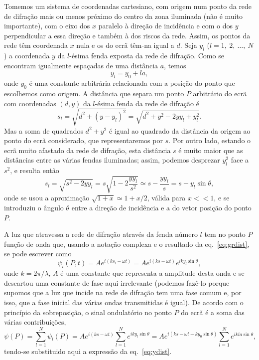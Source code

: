 Tomemos um sistema de coordenadas cartesiano, com origem num ponto da rede de
difração mais ou menos próximo do centro da zona iluminada (não é muito
importante), com o eixo dos $x$ paralelo à direção de incidência e com o dos $y$
perpendicular a essa direção e também à dos riscos da rede. Assim, os pontos da
rede têm coordenada $x$ nula e os do ecrã têm-na igual a $d$. Seja $y_l$ ($l=1,\
2,\ \ldots,\ N$) a coordenada $y$ da $l$-ésima fenda exposta da rede de
difração.  Como se encontram igualmente espaçadas de uma distância $a$, temos
\begin{equation}\label{eq:ydist}
  y_l = y_0+la,
\end{equation}
onde $y_0$ é uma constante arbitrária relacionada com a posição do ponto que
escolhemos como origem. A distância que separa um ponto $P$ arbitrário do ecrã
com coordenadas $(d,y)$ da $l$-ésima fenda da rede de difração é
\begin{equation*}
  s_l=\sqrt{d^2+(y-y_l)^2}=\sqrt{d^2 + y^2 - 2yy_l+y_l^2}.
\end{equation*}
Mas a soma de quadrados $d^2+y^2$ é igual ao quadrado da distância da origem ao
ponto do ecrã considerado, que representaremos por $s$. Por outro lado, estando o
ecrã muito afastado da rede de difração, esta distância $s$ é muito maior que as
distâncias entre as várias fendas iluminadas; assim, podemos desprezar $y_l^2$
face a $s^2$, e resulta então
\begin{equation}\label{eq:grdist}
  s_l=\sqrt{s^2-2yy_l}=s\sqrt{1-2\frac{yy_l}{s^2}}\simeq
  s-\frac{yy_l}{s}=s-y_l\sin\theta,
\end{equation}
onde se usou a aproximação $\sqrt{1+x}\simeq1+x/2$, válida para $x<<1$, e se
introduziu o ângulo $\theta$ entre a direção de incidência e a do
vetor posição do ponto $P$.

A luz que atravessa a rede de difração através da fenda número $l$ tem no ponto
$P$ função de onda que, usando a notação complexa e o resultado da
eq.~\eqref{eq:grdist}, se pode escrever como
\begin{equation*}
  \psi_l(P,t) = Ae^{i(ks_l-\omega t)}=Ae^{i(ks-\omega t)}
  e^{iky_l\sin\theta},
\end{equation*}
onde $k=2\pi/\lambda$, $A$ é uma constante que representa a amplitude desta
onda e se descartou uma constante de fase aqui irrelevante (podemos fazê-lo
porque supomos que a luz que incide na rede de difração tem uma fase comum e,
por isso, que a fase inicial das várias ondas transmitidas é igual). De acordo
com o princípio da sobreposição, o sinal ondulatório no ponto $P$ do ecrã é a
soma das várias contribuições,
\begin{equation}\label{eq:grtsuperp}
  \psi(P)=\sum_{l=1}^N\psi_l(P) =
    Ae^{i(ks-\omega t)} \sum_{l=1}^Ne^{iky_l\sin\theta}=
    Ae^{i(ks-\omega t+ky_0\sin\theta)}\sum_{l=1}^Ne^{ikla\sin\theta},
\end{equation}
tendo-se substituido aqui a expressão da eq.~\eqref{eq:ydist}. 

